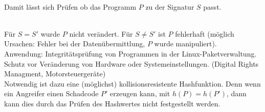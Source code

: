 \documentclass[a4paper]{scrartcl}
\begin{document}
\\
Damit lässt sich Prüfen ob das Programm $P$ zu der Signatur $S$ passt.

\\
Für $S = S'$ wurde $P$ nicht verändert. Für $S \neq S'$ ist $P$ fehlerhaft (möglich Ursachen: Fehler bei der Datenübermittlung, $P$ wurde manipuliert).\\
Anwendung: Integritätsprüfung von Programmen in der Linux-Paketverwaltung.\\
Schutz vor Veränderung von Hardware oder Systemeinstellungen. (Digital Rights Managment, Motorsteuergeräte)\\
Notwendig ist dazu eine (möglichst) kollisionsresistente Hashfunktion. Denn wenn ein Angreifer einen Schadcode $P'$ erzeugen kann, mit $h(P)=h(P')$, dann kann dies durch das Prüfen des Hashwertes nicht festgestellt werden.
\end{document}
